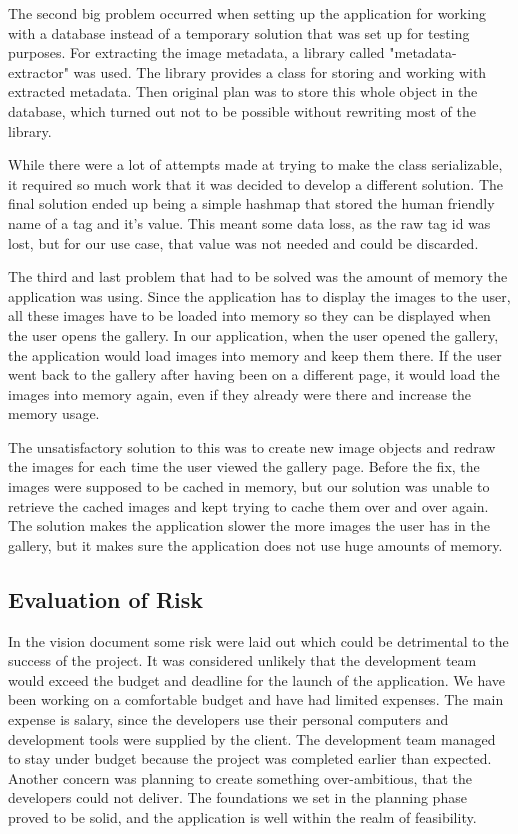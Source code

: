             The second big problem occurred when setting up the application for working with a database instead of a temporary solution that was set up for testing purposes. For extracting the image metadata, a library called "metadata-extractor" was used. The library provides a class for storing and working with extracted metadata. Then original plan was to store this whole object in the database, which turned out not to be possible without rewriting most of the library. 
            
            While there were a lot of attempts made at trying to make the class serializable, it required so much work that it was decided to develop a different solution. The final solution ended up being a simple hashmap that stored the human friendly name of a tag and it's value. This meant some data loss, as the raw tag id was lost, but for our use case, that value was not needed and could be discarded. 
            
            The third and last problem that had to be solved was the amount of memory the application was using. Since the application has to display the images to the user, all these images have to be loaded into memory so they can be displayed when the user opens the gallery. In our application, when the user opened the gallery, the application would load images into memory and keep them there. If the user went back to the gallery after having been on a different page, it would load the images into memory again, even if they already were there and increase the memory usage.
            
            The unsatisfactory solution to this was to create new image objects and redraw the images for each time the user viewed the gallery page. Before the fix, the images were supposed to be cached in memory, but our solution was unable to retrieve the cached images and kept trying to cache them over and over again. The solution makes the application slower the more images the user has in the gallery, but it makes sure the application does not use huge amounts of memory.
        
        \subsection{Evaluation of Risk}
            In the vision document some risk were laid out which could be detrimental to the success of the project. It was considered unlikely that the development team would exceed the budget and deadline for the launch of the application. We have been working on a comfortable budget and have had limited expenses. The main expense is salary, since the developers use their personal computers and development tools were supplied by the client. The development team managed to stay under budget because the project was completed earlier than expected.  Another concern was planning to create something over-ambitious, that the developers could not deliver. The foundations we set in the planning phase proved to be solid, and the application is well within the realm of feasibility. 
            
